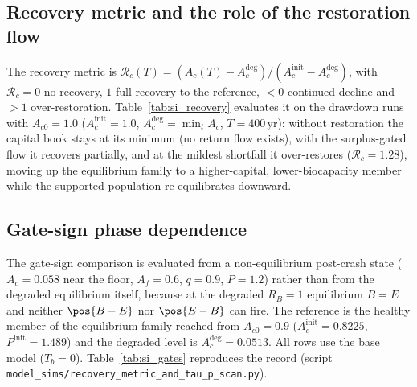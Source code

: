\begin{table}[htbp]
\centering\small
\caption{Minimum capital land $\min_tA_c$ (ha) reached during the run, by initial capital $A_{c0}$ (rows) and initial population $P_0$ (columns); typed floor $\Acmin=0.05$.}
\label{tab:si_drawdown}

\end{table}

\subsection{Recovery metric and the role of the restoration flow}\label{si:recovery}

The recovery metric is $\mathcal R_c(T)=(A_c(T)-A_c^{\mathrm{deg}})/(A_c^{\mathrm{init}}-A_c^{\mathrm{deg}})$, with $\mathcal R_c=0$ no recovery, $1$ full recovery to the reference, $<0$ continued decline and $>1$ over-restoration. Table~\ref{tab:si_recovery} evaluates it on the drawdown runs with $A_{c0}=1.0$ ($A_c^{\mathrm{init}}=1.0$, $A_c^{\mathrm{deg}}=\min_tA_c$, $T=400$\,yr): without restoration the capital book stays at its minimum (no return flow exists), with the surplus-gated flow it recovers partially, and at the mildest shortfall it over-restores ($\mathcal R_c=1.28$), moving up the equilibrium family to a higher-capital, lower-biocapacity member while the supported population re-equilibrates downward.

\begin{table}[htbp]
\centering\small
\caption{Recovery of the capital book after a demand-driven drawdown ($A_{c0}=1.0$, $A_{f0}=0.6$, $q_0=0.9$, $T=400$\,yr): minimum reached, time of the minimum, final capital land without ($\chi_r=0$) and with ($\chi_r=0.10$) surplus-gated restoration, and the recovery metric.}
\label{tab:si_recovery}

\end{table}

\subsection{Gate-sign phase dependence}\label{si:gates}

The gate-sign comparison is evaluated from a non-equilibrium post-crash state ($A_c=0.058$ near the floor, $A_f=0.6$, $q=0.9$, $P=1.2$) rather than from the degraded equilibrium itself, because at the degraded $R_B=1$ equilibrium $B=E$ and neither $\pos{B-E}$ nor $\pos{E-B}$ can fire. The reference is the healthy member of the equilibrium family reached from $A_{c0}=0.9$ ($A_c^{\mathrm{init}}=0.8225$, $P^{\mathrm{init}}=1.489$) and the degraded level is $A_c^{\mathrm{deg}}=0.0513$. All rows use the base model ($T_b=0$). Table~\ref{tab:si_gates} reproduces the record (script \texttt{model\_sims/recovery\_metric\_and\_tau\_p\_scan.py}).

